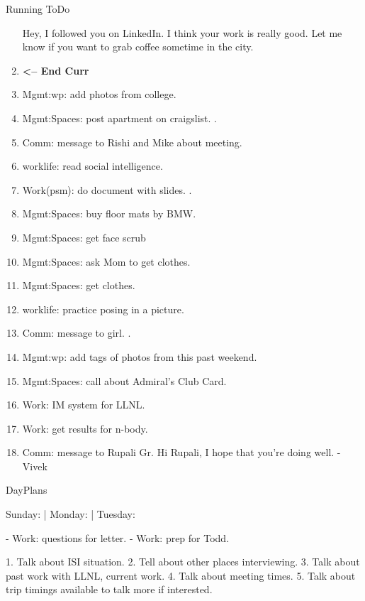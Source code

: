 \begin{columns}
\begin{column}{0.6\linewidth}
\begin{block}{Running ToDo}
\begin{enumerate}
        Hey, I followed you on LinkedIn. I think your work is really good. 
        Let me know if you want to grab coffee sometime in the city. 
        
      \item \tiny \textbf{ <-- End Curr }
      \item \tiny Mgmt:wp: add photos from college.           
      \item \tiny Mgmt:Spaces: post apartment on craigslist. .
      \item \tiny Comm: message to Rishi and Mike about meeting. 
      \item \tiny worklife: read social intelligence.  
      \item \tiny Work(psm): do document with slides. .
      \item \tiny Mgmt:Spaces: buy floor mats by BMW. 
      \item \tiny Mgmt:Spaces: get face scrub
      \item \tiny Mgmt:Spaces: ask Mom to get clothes.
      \item \tiny Mgmt:Spaces: get clothes. 
      \item \tiny worklife: practice posing in a picture.  
      \item \tiny Comm: message to girl.  . 
      \item \tiny Mgmt:wp: add tags of photos from this past weekend.  
      \item \tiny Mgmt:Spaces: call about Admiral's Club Card.
      \item \tiny Work: IM system for LLNL. 
      \item \tiny Work: get results for n-body. 
      \item \tiny Comm: message to Rupali Gr. 
        Hi Rupali, I hope that you're doing well. -Vivek


      \end{enumerate}
    \end{block} 


\begin{block}{DayPlans} 

  Sunday:   
  | Monday: 
  | Tuesday: 

  - Work: questions for letter. 
  - Work: prep for Todd. 

1. Talk about ISI situation.
2. Tell about other places interviewing. 
3. Talk about past work with LLNL, current work. 
4. Talk about meeting times. 
5. Talk about trip timings available to talk more if interested. 



\end{block}
\end{column}
\end{columns}
